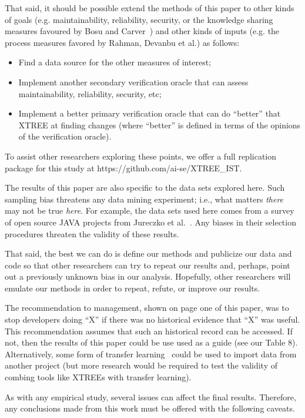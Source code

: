 \documentclass[twocolumn,5p]{elsarticle}
\newcommand{\bi}{\begin{itemize}[leftmargin=0.4cm]}
\newcommand{\ei}{\end{itemize}}
\theoremstyle{break}
\begin{document}
\begin{itemize}
  That said, it should be possible extend the methods of this paper to other kinds of goals (e.g. maintainability, reliability, security,
  or the knowledge sharing measures favoured by Bosu and Carver~\cite{bosu13}) and other kinds of inputs (e.g. the process measures favored by Rahman, Devanbu et al.\cite{Rahman2013})  as follows:
  \bi
  \item Find a data source for the other measures of interest;
  \item Implement another secondary verification oracle that can assess maintainability, reliability, security, etc;
\item Implement a better primary verification oracle that can do ``better'' that XTREE at finding changes (where ``better'' is defined in terms 
of the opinions of the verification oracle).
\ei
To assist other researchers exploring these points, we offer a full replication package for this study at  https://github.com/ai-se/XTREE\_IST.

The results of this paper are also specific to the data sets explored here.
Such sampling bias threatens any data mining experiment; i.e., what matters
{\em there} may not be true {\em here}. For example, the data sets used here comes from a survey of
open source JAVA projects from Jureczko et al.~\cite{jureczko10}. Any biases in their selection procedures
threaten the validity of these results. 

That said,
the best we can do is define our methods and publicize our data and code so that other researchers can
try to repeat our results and, perhaps, point out a previously unknown bias
in our analysis. Hopefully, other researchers will emulate our methods in
order to repeat, refute, or improve our results. 

The recommendation to management, shown on page one of this paper,  was to stop developers doing ``X'' if there was no historical evidence that ``X'' was useful. 
This recommendation assumes that such an  historical record can be accessed. If not,  then the results of this paper could be use used as a guide (see our Table 8). Alternatively, some form of transfer learning~\cite{Nam15,Jing15,krishna16} could be used to import data from another project (but more research would be required to test the validity of combing tools like XTREEs with transfer learning). 


		As with any empirical study, several issues can affect the final results. Therefore, any
		conclusions made from this work must be offered with the following
		caveats.
		

\end{itemize}
\end{document}
